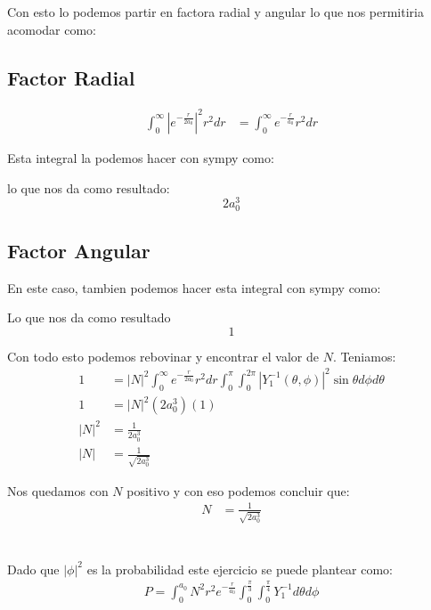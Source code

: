 \documentclass{report}
\begin{document}
Con esto lo podemos partir en factora radial y angular lo que nos permitiria acomodar como:
\subsection{Factor Radial}
\begin{align*}
	\int_0^\infty \left| e^{- \frac{r}{2 a_0}} \right|^2 r^2dr &= \int_0^{\infty} e^{- \frac{r}{a_0}}r^2 dr
\end{align*}

Esta integral la podemos hacer con sympy como:


lo que nos da como resultado: \[
	2 a_{0}^{3}
\]

\subsection{Factor Angular}

En este caso, tambien podemos hacer esta integral con sympy como:


Lo que nos da como resultado \[
	1
\]

Con todo esto podemos rebovinar y encontrar el valor de $N$. Teniamos:
\begin{align*}
	1 &= |N|^2 \int_0^{\infty} e^{-\frac{r}{2 a_0}} r^2  dr \int_0^\pi \int_0^{2\pi} \left|  Y_1^{-1}\left( \theta, \phi \right) \right|^2 \sin\theta d\phi d\theta\\
	1 &= |N|^2 \left( 2a_0^3 \right) \left( 1 \right)\\
	|N|^2 &= \frac{1}{2a_0^3}\\
	|N| &= \frac{1}{\sqrt{2a_0^3}}
\end{align*}

Nos quedamos con $N$ positivo y con eso podemos concluir que:
\begin{align*}
	N &= \frac{1}{\sqrt{2a_0^3}}
\end{align*}

\section{}

Dado que $|\phi|^2$ es la probabilidad este ejercicio se puede plantear como:
\begin{align*}
	P =  \int_{0}^{a_0} N^2 r^2 e^{-\frac{r}{a_0}} \int_0^{\frac{\pi}{3}}\int_0^{\frac{\pi}{4}} Y_1^{-1} d\theta d\phi
\end{align*}
\end{document}
